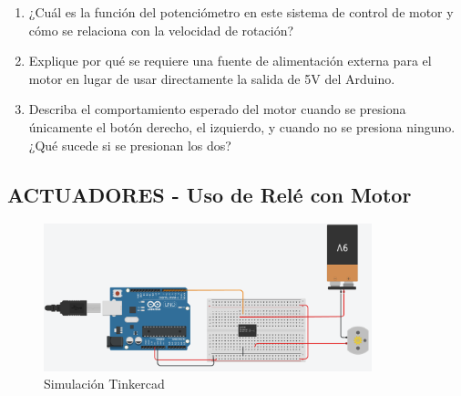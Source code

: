 \documentclass{article}
\begin{document}
\begin{enumerate}
    \item ¿Cuál es la función del potenciómetro en este sistema de control de motor y cómo se
    relaciona con la velocidad de rotación?
    \item Explique por qué se requiere una fuente de alimentación externa para el motor en lugar de usar directamente la salida de 5V del Arduino.
    \item Describa el comportamiento esperado del motor cuando se presiona únicamente el botón
    derecho, el izquierdo, y cuando no se presiona ninguno. ¿Qué sucede si se presionan los dos?
\end{enumerate}



\subsection{ACTUADORES - Uso de Relé con Motor}

\begin{figure}[H]
    \centering
    \includegraphics[width=0.85\textwidth]{./img/ckpt_rele_motor.png}
    \caption{Simulación Tinkercad}
    \label{fig:motor_driver}
\end{figure}
\end{document}
